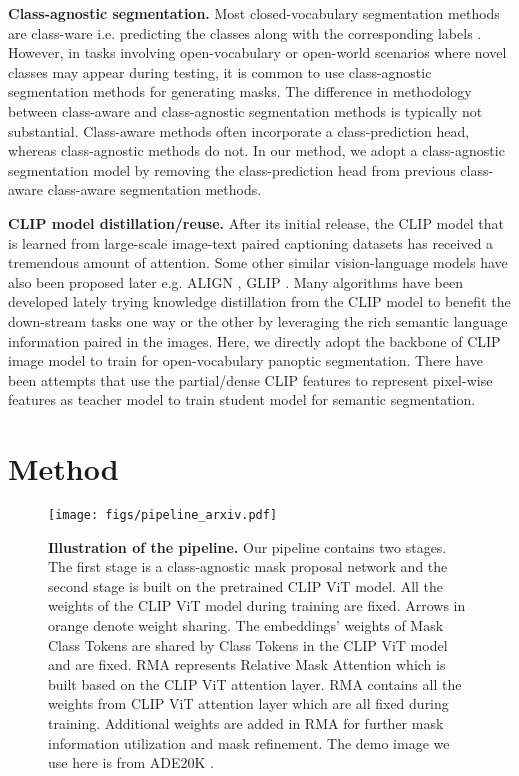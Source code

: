 \documentclass{article}
\theoremstyle{plain}
\theoremstyle{definition}
\theoremstyle{remark}
\begin{document}
\textbf{Class-agnostic segmentation.} Most closed-vocabulary segmentation methods are class-ware i.e. predicting the classes along with the corresponding labels \citep{he2017mask, cheng2021per, cheng2021masked}. However, in tasks involving open-vocabulary or open-world scenarios where novel classes may appear during testing, it is common to use class-agnostic segmentation methods for generating masks\cite{jia2021scaling, qi2022open, xu2022simple}. The difference in methodology between class-aware and class-agnostic segmentation methods is typically not substantial. Class-aware methods often incorporate a class-prediction head, whereas class-agnostic methods do not. In our method, we adopt a class-agnostic segmentation model by removing the class-prediction head from previous class-aware class-aware segmentation methods.

\textbf{CLIP model distillation/reuse.} After its initial release, the CLIP model  \citep{CLIP} that is learned from large-scale image-text paired captioning datasets has received a tremendous amount of attention. Some other similar vision-language models have also been proposed later e.g. ALIGN \citep{jia2021scaling}, GLIP \citep{li2021grounded}.  Many algorithms have been developed lately  \citep{zang2022open,wang2022clip,zhong2021regionclip,luo2021clip4clip,patashnik2021styleclip,shen2021much} trying knowledge distillation from the CLIP model to benefit the down-stream tasks one way or the other by leveraging the rich semantic language information paired in the images. Here, we directly adopt the backbone of CLIP image model to train for open-vocabulary panoptic segmentation. There have been attempts \citep{rao2022denseclip,zhou2022extract} that use the partial/dense CLIP features to represent pixel-wise features as teacher model to train student model for semantic segmentation. 

\section{Method}

\begin{figure*}[h]
    \centering
    \texttt{[image: figs/pipeline\_arxiv.pdf]}
    \caption{\small \textbf{Illustration of the pipeline.} Our pipeline contains two stages. The first stage is a class-agnostic mask proposal network and the second stage is built on the pretrained CLIP ViT model. All the weights of the CLIP ViT model during training are fixed. Arrows in orange denote weight sharing. The embeddings' weights of Mask Class Tokens are shared by Class Tokens in the CLIP ViT model and are fixed. RMA represents Relative Mask Attention which is built based on the CLIP ViT attention layer. RMA contains all the weights from CLIP ViT attention layer which are all fixed during training. Additional weights are added in RMA for further mask information utilization and mask refinement. The demo image we use here is from ADE20K \citep{zhou2016semantic}.}
    \label{fig:network}
\end{figure*}
\end{document}

